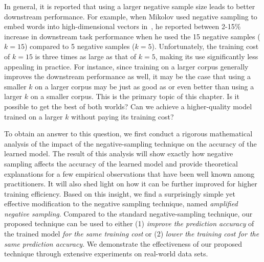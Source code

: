 In general, it is reported that using a larger negative sample size leads to better downstream performance. For example, when Mikolov used negative sampling to embed words into high-dimensional vectors in~\citep{mikolov2013distributed}, he reported between 2-15\% increase in downstream task performance when he used the 15 negative samples ($k=15$) compared to 5 negative samples ($k=5$). Unfortunately, the training cost of $k=15$ is three times as large as that of $k=5$, making its use significantly less appealing in practice. For instance, since training on a larger corpus generally improves the downstream performance as well, it may be the case that using a smaller $k$ on a larger corpus may be just as good as or even better than using a larger $k$ on a smaller corpus. This is the primary topic of this chapter. Is it possible to get the best of both worlds? Can we achieve a higher-quality model trained on a larger $k$ without paying its training cost?

To obtain an answer to this question, we first conduct a rigorous mathematical analysis of the impact of the negative-sampling technique on the accuracy of the learned model. The result of this analysis will show exactly how negative sampling affects the accuracy of the learned model and provide theoretical explanations for a few empirical observations that have been well known among practitioners. It will also shed light on how it can be further improved for higher training efficiency. Based on this insight, we find a surprisingly simple yet effective  modification to the negative sampling technique, named \emph{amplified negative sampling}.  Compared to the standard negative-sampling technique, our proposed technique can be used to either (1) \emph{improve the prediction accuracy} of the trained model \emph{for the same training cost} or (2) \emph{lower the training cost for the same prediction accuracy}. We demonstrate the effectiveness of our proposed technique through extensive experiments on real-world data sets.

